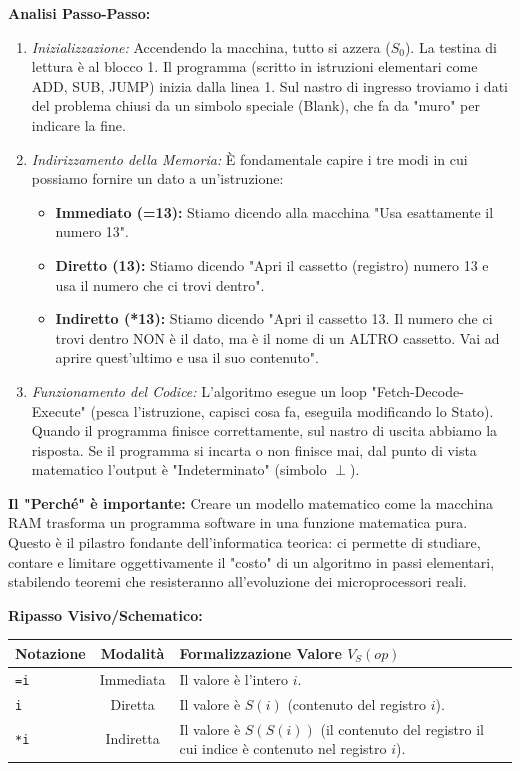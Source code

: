 \documentclass[a4paper, 11pt]{report}
\begin{document}
\textbf{Analisi Passo-Passo:}
\begin{enumerate}
\item \textit{Inizializzazione:} Accendendo la macchina, tutto si azzera ($S_0$). La testina di lettura è al blocco 1. Il programma (scritto in istruzioni elementari come ADD, SUB, JUMP) inizia dalla linea 1. Sul nastro di ingresso troviamo i dati del problema chiusi da un simbolo speciale (Blank), che fa da "muro" per indicare la fine.
\item \textit{Indirizzamento della Memoria:} È fondamentale capire i tre modi in cui possiamo fornire un dato a un'istruzione:
\begin{itemize}
\item \textbf{Immediato (=13):} Stiamo dicendo alla macchina "Usa esattamente il numero 13".
\item \textbf{Diretto (13):} Stiamo dicendo "Apri il cassetto (registro) numero 13 e usa il numero che ci trovi dentro".
\item \textbf{Indiretto (*13):} Stiamo dicendo "Apri il cassetto 13. Il numero che ci trovi dentro NON è il dato, ma è il nome di un ALTRO cassetto. Vai ad aprire quest'ultimo e usa il suo contenuto".
\end{itemize}
\item \textit{Funzionamento del Codice:} L'algoritmo esegue un loop "Fetch-Decode-Execute" (pesca l'istruzione, capisci cosa fa, eseguila modificando lo Stato). Quando il programma finisce correttamente, sul nastro di uscita abbiamo la risposta. Se il programma si incarta o non finisce mai, dal punto di vista matematico l'output è "Indeterminato" (simbolo $\perp$).
\end{enumerate}

\textbf{Il "Perché" è importante:}
Creare un modello matematico come la macchina RAM trasforma un programma software in una funzione matematica pura. Questo è il pilastro fondante dell'informatica teorica: ci permette di studiare, contare e limitare oggettivamente il "costo" di un algoritmo in passi elementari, stabilendo teoremi che resisteranno all'evoluzione dei microprocessori reali.

\textbf{Ripasso Visivo/Schematico:}
\begin{center}
\begin{tabular}{|l|c|p{7cm}|}
\hline
\textbf{Notazione} & \textbf{Modalità} & \textbf{Formalizzazione Valore $V_S(op)$} \\
\hline
\texttt{=i} & Immediata & Il valore è l'intero $i$. \\
\hline
\texttt{i} & Diretta & Il valore è $S(i)$ (contenuto del registro $i$). \\
\hline
\texttt{*i} & Indiretta & Il valore è $S(S(i))$ (il contenuto del registro il cui indice è contenuto nel registro $i$). \\
\hline
\end{tabular}
\end{center}
\end{document}
